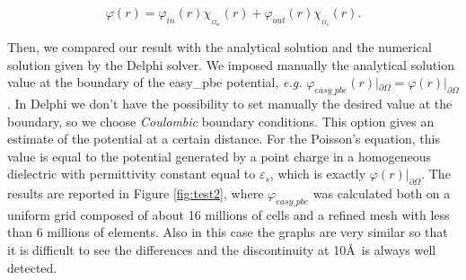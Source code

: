 \documentclass[11pt,a4paper]{article}
\begin{document}
\begin{equation}
    {\varphi}(r) = {\varphi}_{in}(r)\chi_{_{\Omega_m}}(r) + {\varphi}_{out}(r)\chi_{_{\Omega_s}}(r).
    \label{eq:exact_unitsphere_disc}
\end{equation}

Then, we compared our result with the analytical solution and the numerical solution given by the Delphi solver. We imposed manually the analytical solution value at the boundary of the easy\_pbe potential, \emph{e.g.} ${\varphi}_{easy\_pbe}(r)|_{\partial \Omega} = {\varphi}(r)|_{\partial \Omega}$. In Delphi we don't have the possibility to set manually the desired value at the boundary, so we choose \emph{Coulombic} boundary conditions. This option gives an estimate of the potential at a certain distance. For the Poisson's equation, this value is equal to the potential generated by a point charge in a homogeneous dielectric with permittivity constant equal to $\varepsilon_s$, which is exactly ${\varphi}(r)|_{\partial \Omega}$. The results are reported in Figure \ref{fig:test2}, where $\varphi_{easy\_pbe}$ was calculated both on a uniform grid composed of about 16 millions of cells and a refined mesh with less than 6 millions of elements. Also in this case the graphs are very similar so that it is difficult to see the differences and the discontinuity at 10\AA\ is always well detected.
\end{document}
